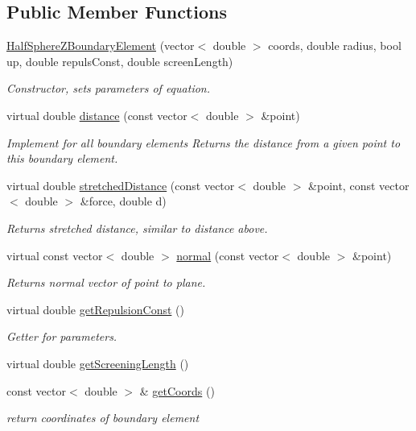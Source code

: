 \subsection*{Public Member Functions}
\begin{DoxyCompactItemize}
\item 
\hyperlink{classHalfSphereZBoundaryElement_a5a8a08144d00155c08d700783215c788}{Half\+Sphere\+Z\+Boundary\+Element} (vector$<$ double $>$ coords, double radius, bool up, double repuls\+Const, double screen\+Length)
\begin{DoxyCompactList}\small\item\em Constructor, sets parameters of equation. \end{DoxyCompactList}\item 
virtual double \hyperlink{classHalfSphereZBoundaryElement_ad954352392ba721b772cf9a0177edec1}{distance} (const vector$<$ double $>$ \&point)
\begin{DoxyCompactList}\small\item\em Implement for all boundary elements Returns the distance from a given point to this boundary element. \end{DoxyCompactList}\item 
virtual double \hyperlink{classHalfSphereZBoundaryElement_a836d5117066fbfab38903475e5fc0d8d}{stretched\+Distance} (const vector$<$ double $>$ \&point, const vector$<$ double $>$ \&force, double d)
\begin{DoxyCompactList}\small\item\em Returns stretched distance, similar to distance above. \end{DoxyCompactList}\item 
virtual const vector$<$ double $>$ \hyperlink{classHalfSphereZBoundaryElement_a3d1287ac0239294c1dbfdd2c799dcd7f}{normal} (const vector$<$ double $>$ \&point)
\begin{DoxyCompactList}\small\item\em Returns normal vector of point to plane. \end{DoxyCompactList}\item 
virtual double \hyperlink{classHalfSphereZBoundaryElement_a672b90ff798b849ef705384ab9f745bc}{get\+Repulsion\+Const} ()
\begin{DoxyCompactList}\small\item\em Getter for parameters. \end{DoxyCompactList}\item 
virtual double \hyperlink{classHalfSphereZBoundaryElement_ab7b9034066dbc5bec386a04f6bc3a91f}{get\+Screening\+Length} ()
\item 
const vector$<$ double $>$ \& \hyperlink{classBoundaryElement_ace76817d750bb44c11edd918f1a8b78f}{get\+Coords} ()
\begin{DoxyCompactList}\small\item\em return coordinates of boundary element \end{DoxyCompactList}\end{DoxyCompactItemize}
